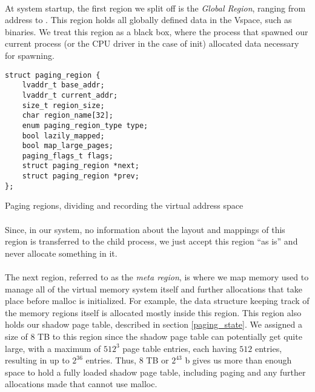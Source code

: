 \paragraph{}
At system startup, the first region we split off is the \textit{Global Region}, ranging from address  to . This region holds all globally defined data in the Vspace, such as binaries. We treat this region as a black box, where the process that spawned our current process (or the CPU driver in the case of init) allocated data necessary
for spawning.
\begin{code}
\begin{mdframed}[style=myframe]
\begin{verbatim}
struct paging_region {
    lvaddr_t base_addr;
    lvaddr_t current_addr;
    size_t region_size;
    char region_name[32]; 
    enum paging_region_type type;
    bool lazily_mapped;
    bool map_large_pages;
    paging_flags_t flags;
    struct paging_region *next;
    struct paging_region *prev;
};
\end{verbatim}
\end{mdframed}


\caption{Paging regions, dividing and recording the virtual address space }
\newline
\label{code:paging_region}
\end{code}
\paragraph{}



Since, in our system, no information about the layout and mappings
of this region is transferred to the child process, we just accept this region “as is” and never allocate something in it. 
\paragraph{}
The next region, referred to as the \textit{meta region}, is where we map memory used to manage all of the virtual memory system itself and further allocations that take place before malloc is initialized. For example, the data structure keeping track of the memory regions itself is allocated mostly inside this region. This region also holds our shadow page table, described in section \ref{paging_state}. We assigned a size of 8 TB to this region since the shadow page table can potentially get quite large, with a maximum of $512^3$ page table entries, each having $512$ entries, resulting in up to $2^{36}$ entries. Thus, 8 TB or $2^{43}$ b gives us more than enough space to hold a fully loaded shadow page table, including paging and any further allocations made that cannot use malloc.
